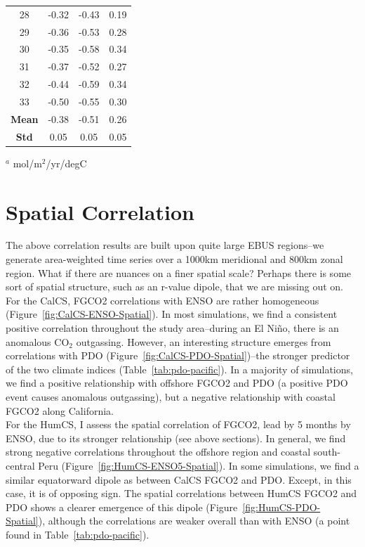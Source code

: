 \documentclass[12pt]{article}
\begin{document}
\begin{table}
\begin{tabular}{c c c c}
	28 &  -0.32 &    -0.43 &       0.19 \\
	29 &  -0.36 &    -0.53 &       0.28 \\
	30 &  -0.35 &    -0.58 &       0.34 \\
	31 &  -0.37 &    -0.52 &       0.27 \\
	32 &  -0.44 &    -0.59 &       0.34 \\
	33 &  -0.50 &    -0.55 &       0.30 \\
	\bottomrule
	\textbf{Mean} & -0.38 & -0.51 & 0.26  \\
	\textbf{Std} & 0.05 & 0.05 & 0.05  \\
\end{tabular}
\begin{tablenotes}
	\centering
	\item $^{a}$ mol/m$^{2}$/yr/degC
\end{tablenotes}
\label{tab:HumCS-ENSO-5lag}
\end{table}

\clearpage
\section{Spatial Correlation}
The above correlation results are built upon quite large EBUS regions--we generate area-weighted time series over a 1000km meridional and 800km zonal region. What if there are nuances on a finer spatial scale? Perhaps there is some sort of spatial structure, such as an r-value dipole, that we are missing out on. \\

For the CalCS, FGCO2 correlations with ENSO are rather homogeneous (Figure~\ref{fig:CalCS-ENSO-Spatial}). In most simulations, we find a consistent positive correlation throughout the study area--during an El Ni\~no, there is an anomalous CO$_{2}$ outgassing. However, an interesting structure emerges from correlations with PDO (Figure~\ref{fig:CalCS-PDO-Spatial})--the stronger predictor of the two climate indices (Table~\ref{tab:pdo-pacific}). In a majority of simulations, we find a positive relationship with offshore FGCO2 and PDO (a positive PDO event causes anomalous outgassing), but a negative relationship with coastal FGCO2 along California. \\

For the HumCS, I assess the spatial correlation of FGCO2, lead by 5 months by ENSO, due to its stronger relationship (see above sections). In general, we find strong negative correlations throughout the offshore region and coastal south-central Peru (Figure~\ref{fig:HumCS-ENSO5-Spatial}). In some simulations, we find a similar equatorward dipole as between CalCS FGCO2 and PDO. Except, in this case, it is of opposing sign. The spatial correlations between HumCS FGCO2 and PDO shows a clearer emergence of this dipole (Figure~\ref{fig:HumCS-PDO-Spatial}), although the correlations are weaker overall than with ENSO (a point found in Table~\ref{tab:pdo-pacific}). \\
\end{document}
